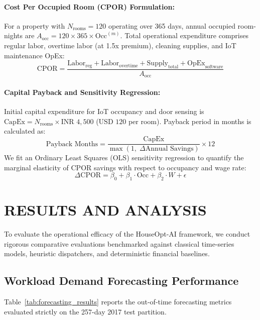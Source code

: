 \documentclass[11pt,a4paper]{article}
\newcommand{\INR}{\text{INR }}
\newcommand{\USD}{\text{USD }}
\begin{document}
\paragraph{Cost Per Occupied Room (CPOR) Formulation:} For a property with $N_{\text{rooms}} = 120$ operating over 365 days, annual occupied room-nights are $A_{\text{occ}} = 120 \times 365 \times \text{Occ}^{(m)}$. Total operational expenditure comprises regular labor, overtime labor (at 1.5x premium), cleaning supplies, and IoT maintenance OpEx:
\begin{equation}
\text{CPOR} = \frac{\text{Labor}_{\text{reg}} + \text{Labor}_{\text{overtime}} + \text{Supply}_{\text{total}} + \text{OpEx}_{\text{software}}}{A_{\text{occ}}}
\end{equation}

\paragraph{Capital Payback and Sensitivity Regression:} Initial capital expenditure for IoT occupancy and door sensing is $\text{CapEx} = N_{\text{rooms}} \times \INR 4,500$ ($\USD 120$ per room). Payback period in months is calculated as:
\begin{equation}
\text{Payback Months} = \frac{\text{CapEx}}{\max(1, \; \Delta \text{Annual Savings})} \times 12
\end{equation}
We fit an Ordinary Least Squares (OLS) sensitivity regression to quantify the marginal elasticity of CPOR savings with respect to occupancy and wage rate:
\begin{equation}
\Delta \text{CPOR} = \beta_0 + \beta_1 \cdot \text{Occ} + \beta_2 \cdot W + \epsilon
\end{equation}

\section{RESULTS AND ANALYSIS}

To evaluate the operational efficacy of the HouseOpt-AI framework, we conduct rigorous comparative evaluations benchmarked against classical time-series models, heuristic dispatchers, and deterministic financial baselines.

\subsection{Workload Demand Forecasting Performance}
Table~\ref{tab:forecasting_results} reports the out-of-time forecasting metrics evaluated strictly on the 257-day 2017 test partition.
\end{document}
